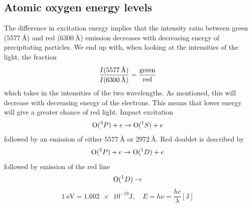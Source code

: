 \subsection{Atomic oxygen energy levels}
The difference in excitation energy implies that the intensity ratio between green (\(\SI{5577}{\angstrom}\)) and red (\(\SI{6300}{\angstrom}\)) emission decreases with decreasing energy of precipitating particles. We end up with, when looking at the intensities of the light, the fraction
\begin{equation*}
    \frac{I(\SI{5577}{\angstrom})}{I(\SI{6300}{\angstrom})}=\frac{\textnormal{green}}{\textnormal{red}}
\end{equation*}
which takes in the intensities of the two wavelengths. As mentioned, this will decrease with decreasing energy of the electrons. This means that lower energy will give a greater chance of red light.
Impact excitation
\begin{equation*}
    \textnormal{O}(\prescript{3}{}{P})+e\rightarrow \textnormal{O}(\prescript{1}{}{S})+e
\end{equation*}
followed by an emission of either \(\SI{5577}{\angstrom}\) or \(\SI{2972}{\angstrom}\). Red doublet is described by
\begin{equation*}
    \textnormal{O}(\prescript{3}{}{P})+e\rightarrow \textnormal{O}(\prescript{1}{}{D})+e
\end{equation*}
followed by emission of the red line
\begin{equation*}
    \textnormal{O}(\prescript{1}{}{D})\rightarrow
\end{equation*}
\begin{equation*}
    \boxed{\SI{1}{\electronvolt}=\num{1.602e-19}\si{\joule},\quad E=h\nu=\frac{hc}{\lambda} [\si{\joule}]}
\end{equation*}

